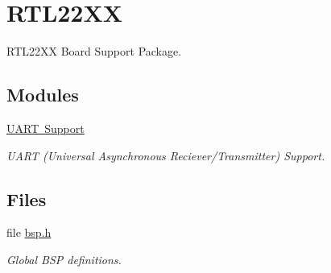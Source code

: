 \hypertarget{group__RTEMSBSPsARMRTL22XX}{}\section{R\+T\+L22\+XX}
\label{group__RTEMSBSPsARMRTL22XX}


R\+T\+L22\+XX Board Support Package.  


\subsection*{Modules}
\begin{DoxyCompactItemize}
\item 
\mbox{\hyperlink{group__rtl22xx__uart}{U\+A\+R\+T Support}}
\begin{DoxyCompactList}\small\item\em U\+A\+RT (Universal Asynchronous Reciever/\+Transmitter) Support. \end{DoxyCompactList}\end{DoxyCompactItemize}
\subsection*{Files}
\begin{DoxyCompactItemize}
\item 
file \mbox{\hyperlink{bsps_2arm_2rtl22xx_2include_2bsp_8h}{bsp.\+h}}
\begin{DoxyCompactList}\small\item\em Global B\+SP definitions. \end{DoxyCompactList}\end{DoxyCompactItemize}
